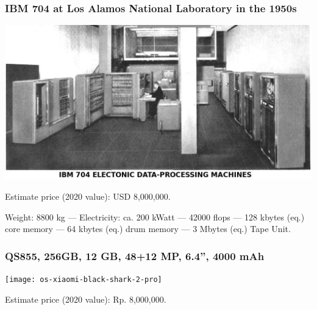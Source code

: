 \documentclass[xcolor=table, notheorems, hyperref={pdfpagelabels=false}]{beamer}
\begin{document}
\begin{frame}
\frametitle{IBM 704 at Los Alamos National Laboratory in the 1950s}
\includegraphics[width=0.90\linewidth]{os-ibm704}

Estimate price (2020 value): USD 8,000,000.

Weight: 8800 kg --- Electricity: ca. 200 kWatt --- 42000 flops --- 
128 kbytes (eq.) core memory --- 64 kbytes (eq.) drum memory --- 3 Mbytes (eq.) Tape Unit.

\end{frame}

\begin{frame}
\frametitle{QS855, 256GB, 12 GB, 48+12 MP, 6.4'', 4000 mAh}
\texttt{[image: os-xiaomi-black-shark-2-pro]}

Estimate price (2020 value): Rp. 8,000,000.

\end{frame}

\end{document}

